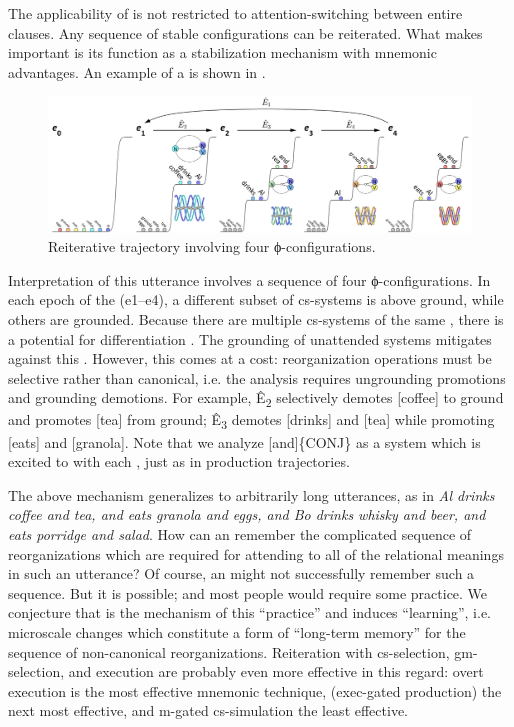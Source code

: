   The applicability of  is not restricted to attention-switching between entire clauses. Any sequence of stable configurations can be reiterated. What makes  important is its function as a stabilization mechanism with mnemonic advantages. An example of a  is shown in {}.  

\z
  
\begin{figure}
\includegraphics[width=\textwidth]{figures/Tilsen-img123.png}
\caption{Reiterative trajectory involving four ϕ-con\-fi\-gu\-ra\-tions.}
\label{fig:6:4}
\end{figure}
 

  Interpretation of this utterance involves a  sequence of four ϕ-con\-fi\-gu\-ra\-tions. In each epoch of the  (e1--e4), a different subset of cs-sys\-tems is above ground, while others are grounded. Because there are multiple cs-sys\-tems of the same , there is a potential for differentiation . The grounding of unattended systems mitigates against this . However, this comes at a cost: reorganization operations must be selective rather than canonical, i.e. the analysis requires ungrounding promotions and grounding demotions. For example, Ê\textsubscript{2} selectively demotes [coffee] to ground and promotes [tea] from ground; Ê\textsubscript{3} demotes [drinks] and [tea] while promoting [eats] and [granola]. Note that we analyze [and]\{CONJ\} as a system which is excited to  with each , just as in production trajectories.

  The above mechanism generalizes to arbitrarily long utterances, as in \textit{Al drinks coffee and tea, and eats granola and eggs, and Bo drinks whisky and beer, and eats porridge and salad}. How can an  remember the complicated sequence of reorganizations which are required for attending to all of the relational meanings in such an utterance? Of course, an  might not successfully remember such a sequence. But it is possible; and most people would require some practice. We conjecture that  is the mechanism of this “practice” and induces “learning”, i.e. microscale changes which constitute a form of “long-term memory” for the sequence of non-canonical reorganizations. Reiteration with cs-selection, gm-selection, and execution are probably even more effective in this regard: overt execution is the most effective mnemonic technique,  (exec-gated production) the next most effective, and m-gated cs-simulation the least effective.

